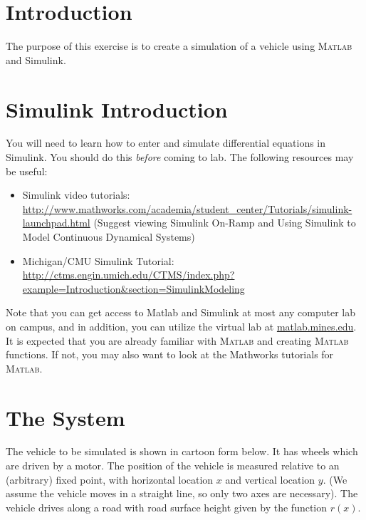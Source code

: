 \begin{frame}
  \titlepage
\end{frame}



\section{Introduction}
The purpose of this exercise is to create a simulation of a vehicle using \textsc{Matlab} and Simulink. 

\section{Simulink Introduction}

You will need to learn how to enter and simulate differential equations in Simulink. You should do this {\em before} coming to lab. The following resources may be useful:
\begin{itemize}
\item Simulink video tutorials: \url{http://www.mathworks.com/academia/student_center/Tutorials/simulink-launchpad.html} (Suggest viewing Simulink On-Ramp and Using Simulink to Model Continuous Dynamical Systems)
\item Michigan/CMU Simulink Tutorial: \url{http://ctms.engin.umich.edu/CTMS/index.php?example=Introduction&section=SimulinkModeling}
\end{itemize}
Note that you can get access to Matlab and Simulink at most any computer lab on campus, and in addition, you can utilize the virtual lab at \url{matlab.mines.edu}. It is expected that you are already familiar with \textsc{Matlab} and creating \textsc{Matlab} functions. If not, you may also want to look at the Mathworks tutorials for \textsc{Matlab}.

\section{The System}

The vehicle to be simulated is shown in cartoon form below. It has wheels which are driven by a motor.  The position of the vehicle is measured relative to an (arbitrary) fixed point, with horizontal location $x$ and vertical location $y$. (We assume the vehicle moves in a straight line, so only two axes are necessary).  The vehicle drives along a road with road surface height given by the function $r(x)$. 

